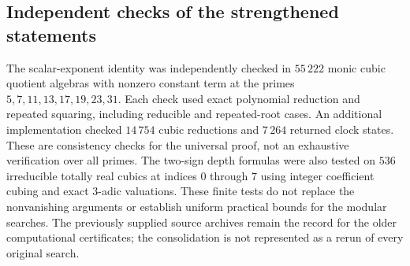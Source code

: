 \documentclass[11pt,a4paper]{article}
\theoremstyle{definition}\newtheorem{definition}[theorem]{Definition}
\theoremstyle{remark}\newtheorem{remark}[theorem]{Remark}
\begin{document}
\subsection{Independent checks of the strengthened statements}
The scalar-exponent identity was independently checked in $55\,222$
monic cubic quotient algebras with nonzero constant term at the primes
$5,7,11,13,17,19,23,31$. Each check used exact polynomial reduction
and repeated squaring, including reducible and repeated-root cases.
An additional implementation checked $14\,754$ cubic reductions and
$7\,264$ returned clock states. These are consistency checks for the
universal proof, not an exhaustive verification over all primes.
The two-sign depth formulas were also tested on $536$ irreducible
totally real cubics at indices $0$ through $7$ using integer coefficient
cubing and exact $3$-adic valuations. These finite tests do not replace
the nonvanishing arguments or establish uniform practical bounds for
the modular searches. The previously supplied source archives remain
the record for the older computational certificates; the consolidation
is not represented as a rerun of every original search.
\end{document}
